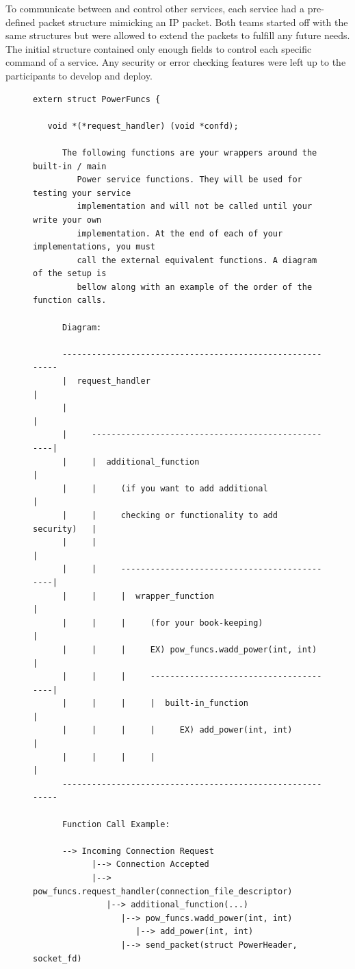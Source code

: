 \documentclass[10pt]{article}
\begin{document}
To communicate between and control other services, each service had a
pre-defined packet structure mimicking an IP packet. Both teams started off with
the same structures but were allowed to extend the packets to fulfill any
future needs. The initial structure contained only enough fields to control each
specific command of a service. Any security or error checking features were left
up to the participants to develop and deploy. 

\begin{figure}[here!]
\small
\begin{verbatim}
extern struct PowerFuncs {     

   void *(*request_handler) (void *confd);

      The following functions are your wrappers around the built-in / main 
      	 Power service functions. They will be used for testing your service 
         implementation and will not be called until your write your own
         implementation. At the end of each of your implementations, you must
         call the external equivalent functions. A diagram of the setup is
         bellow along with an example of the order of the function calls.

      Diagram:

      ----------------------------------------------------------
      |  request_handler                                       |
      |                                                        |
      |     ---------------------------------------------------|
      |     |  additional_function                             |
      |     |     (if you want to add additional               |
      |     |     checking or functionality to add security)   |
      |     |                                                  |
      |     |     ---------------------------------------------|
      |     |     |  wrapper_function                          |
      |     |     |     (for your book-keeping)                |
      |     |     |     EX) pow_funcs.wadd_power(int, int)     |
      |     |     |     ---------------------------------------|
      |     |     |     |  built-in_function                   |
      |     |     |     |     EX) add_power(int, int)          |
      |     |     |     |                                      |
      ----------------------------------------------------------

      Function Call Example:
         
      --> Incoming Connection Request
            |--> Connection Accepted
            |--> pow_funcs.request_handler(connection_file_descriptor)
               |--> additional_function(...)
                  |--> pow_funcs.wadd_power(int, int)
                     |--> add_power(int, int)
                  |--> send_packet(struct PowerHeader, socket_fd)


\end{verbatim}
\end{figure}
\end{document}
